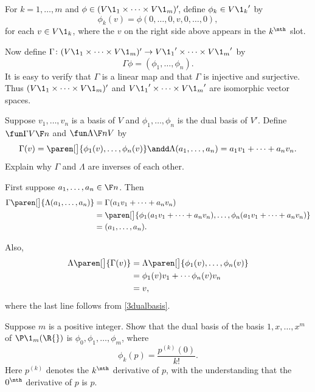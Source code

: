 \begin{Solution}
For $k = 1, \dots, m$ and $\phi \in (V\1_1 \times \dots \times V\1_m)'\!$, define $\phi_k \in {V\1_k}'$ by
\[
\phi_k(v) = \phi( 0, \dots, 0, v, 0, \dots, 0),
\]
for each $v \in V\1_k$, where the $v$ on the right side above appears in the $k^\nth$ slot.

Now define $\Gamma \colon (V\1_1 \times \dots \times V\1_m)' \to {V\1_1}' \times \dots \times {V\1_m}'$ by
\[
\Gamma \phi = (\phi_1, \dots, \phi_n).
\]
It is easy to verify that $\Gamma$ is a linear map and that $\Gamma$ is injective and surjective. Thus $(V\1_1 \times \dots \times V\1_m)'$ and ${V\1_1}' \times \dots \times {V\1_m}'$ are isomorphic vector spaces.
\end{Solution}

\exercise
Suppose $v_1, \ldots, v_n$ is a basis of $V$ and $\phi_1, \ldots, \phi_n$ is the dual basis of $V'\!$. Define $\fun \Gamma  V {\F n}$ and
$\fun \Lambda {\F n} V$ by
\[
\Gamma(v) = \paren[\big]{ \phi_1(v), \ldots, \phi_n(v) }
\andd
\Lambda(a_1, \ldots, a_n) = a_1 v_1 + \cdots + a_n v_n.
\]
Explain why $\Gamma$ and $\Lambda$ are inverses of each other.

\begin{Solution}
First suppose $a_1, \ldots, a_n \in \F n$. Then
\begin{align*}
\Gamma\paren[\big]{ \Lambda(a_1, \ldots, a_n) } &= \Gamma( a_1 v_1 + \cdots + a_n v_n ) \\
&= \paren[\big]{ \phi_1( a_1 v_1 + \cdots + a_n v_n ), \ldots, \phi_n( a_1 v_1 + \cdots + a_n v_n ) }\\
&= (a_1, \ldots, a_n).
\end{align*}

Also,
\begin{align*}
\Lambda\paren[\big]{\Gamma(v) } &= \Lambda\paren[\big]{ \phi_1(v), \ldots, \phi_n(v) } \\
&=  \phi_1(v) v_1 + \cdots \phi_n(v) v_n \\
&= v,
\end{align*}
where the last line follows from \ref{3dualbasis}.
\end{Solution}

\exercise
Suppose $m$ is a positive integer. Show that the dual basis of the basis $1, x, \dots, x^m$ of $\P\1_m(\R{})$ is $\phi_0, \phi_1, \dots, \phi_m$, where
\[
\phi_k(p) = \frac{p^{(k)}(0)}{k!}.
\]
Here $p^{(k)}$ denotes the $k^\nth$ derivative  of $p$, with the understanding that the $0^\nth$ derivative of $p$ is $p$.

